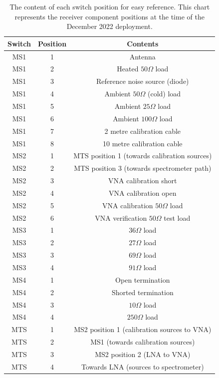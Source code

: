 \begin{table}
    \begin{center}
    \begin{tabular}{ |c|c|c| }
        \hline
        {Switch} & {Position} & {Contents}\\
        \hline
        MS1 & 1 & Antenna \\
        MS1 & 2 & Heated $50 \Omega$ load \\
        MS1 & 3 & Reference noise source (diode) \\
        MS1 & 4 & Ambient $50 \Omega$ (cold) load \\
        MS1 & 5 & Ambient $25 \Omega$ load \\
        MS1 & 6 & Ambient $100 \Omega$ load \\
        MS1 & 7 & 2 metre calibration cable \\
        MS1 & 8 & 10 metre calibration cable \\
        \hline
        MS2 & 1 & MTS position 1 (towards calibration sources) \\
        MS2 & 2 & MTS position 3 (towards spectrometer path) \\
        MS2 & 3 & VNA calibration short \\
        MS2 & 4 & VNA calibration open \\
        MS2 & 5 & VNA calibration $50 \Omega$ load \\
        MS2 & 6 & VNA verification $50 \Omega$ test load \\
        \hline
        MS3 & 1 & $36 \Omega$ load \\
        MS3 & 2 & $27 \Omega$ load \\
        MS3 & 3 & $69 \Omega$ load \\
        MS3 & 4 & $91 \Omega$ load \\
        \hline
        MS4 & 1 & Open termination \\
        MS4 & 2 & Shorted termination \\
        MS4 & 3 & $10 \Omega$ load \\
        MS4 & 4 & $250 \Omega$ load \\
        \hline
        MTS & 1 & MS2 position 1 (calibration sources to VNA) \\
        MTS & 2 & MS1 (towards calibration sources) \\
        MTS & 3 & MS2 position 2 (LNA to VNA) \\
        MTS & 4 & Towards LNA (sources to spectrometer)\\
        \hline
    \end{tabular}
    \end{center}
    \caption{The content of each switch position for easy reference. This chart represents the receiver component positions at the time of the December 2022 deployment.}
    \label{tab:switch_content}
\end{table}

